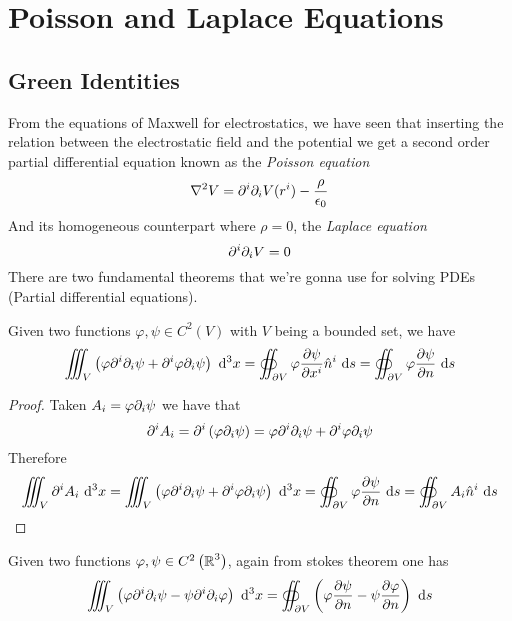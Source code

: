 \documentclass[../electromagnetism]{subfiles}
\begin{document}
\section{Poisson and Laplace Equations}
\subsection{Green Identities}
From the equations of Maxwell for electrostatics, we have seen that inserting the relation between the electrostatic field and the potential we get a second order partial differential equation known as the \textit{Poisson equation}
\begin{equation}
	\nabla^2V=\partial^i\partial_iV(r^i)-\frac{\rho}{\epsilon_0}
	\label{eq:poissoneq1}
\end{equation}
And its homogeneous counterpart where $\rho=0$, the \textit{Laplace equation}
\begin{equation}
	\partial^i\partial_iV=0
	\label{eq:laplaceeq}
\end{equation}
There are two fundamental theorems that we're gonna use for solving PDEs (Partial differential equations).
\begin{thm}
	Given two functions $\varphi,\psi\in C^2(V)$ with $V$ being a bounded set, we have
	\begin{equation}
		\iiint_{V}^{}\left( \varphi\partial^i\partial_i\psi+\partial^i\varphi\partial_i\psi \right)\ \mathrm{d}^3x=\oiint_{\partial V}\varphi\pdv{\psi}{x^i}\hat{n}^i\ \mathrm{d} s=\oiint_{\partial V}\varphi\pdv{\psi}{n}\ \mathrm{d} s
		\label{eq:green1id}
	\end{equation}
\end{thm}
\begin{proof}
	Taken $A_i=\varphi\partial_i\psi$ we have that
	\begin{equation*}
		\partial^iA_i=\partial^i\left( \varphi\partial_i\psi \right)=\varphi\partial^i\partial_i\psi+\partial^i\varphi\partial_i\psi
	\end{equation*}
	Therefore
	\begin{equation*}
		\iiint_V\partial^iA_i\ \mathrm{d}^3x=\iiint_V\left( \varphi\partial^i\partial_i\psi+\partial^i\varphi\partial_i\psi \right)\ \mathrm{d}^3x=\oiint_{\partial V}\varphi\pdv{\psi}{n}\ \mathrm{d} s=\oiint_{\partial V}A_i\hat{n}^i\ \mathrm{d} s
	\end{equation*}
\end{proof}
\begin{thm}
	Given two functions $\varphi,\psi\in C^2\left( \operatorname{\mathbb{R}}^3 \right)$, again from stokes theorem one has
	\begin{equation}
		\iiint_V\left( \varphi\partial^i\partial_i\psi-\psi\partial^i\partial_i\varphi \right)\ \mathrm{d}^3x=\oiint_{\partial V}\left( \varphi\pdv{\psi}{n}-\psi\pdv{\varphi}{n} \right)\ \mathrm{d} s
		\label{eq:green2id}
	\end{equation}
\end{thm}
\end{document}
